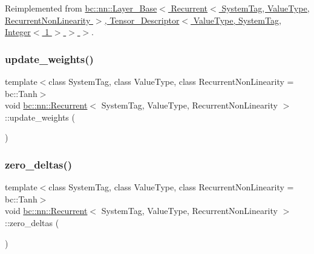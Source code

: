 Reimplemented from \hyperlink{structbc_1_1nn_1_1Layer__Base_a8365fc3fc656aadeb0513d8e02b5fba0}{bc\+::nn\+::\+Layer\+\_\+\+Base$<$ Recurrent$<$ System\+Tag, Value\+Type, Recurrent\+Non\+Linearity $>$, Tensor\+\_\+\+Descriptor$<$ Value\+Type, System\+Tag, Integer$<$ 1 $>$ $>$ $>$}.

\mbox{\label{structbc_1_1nn_1_1Recurrent_adcbd0a7b6f9306df5eed70afcb62ef56}} 
\subsubsection{\texorpdfstring{update\+\_\+weights()}{update\_weights()}}
{\footnotesize\ttfamily template$<$class System\+Tag, class Value\+Type, class Recurrent\+Non\+Linearity = bc\+::\+Tanh$>$ \\
void \hyperlink{structbc_1_1nn_1_1Recurrent}{bc\+::nn\+::\+Recurrent}$<$ System\+Tag, Value\+Type, Recurrent\+Non\+Linearity $>$\+::update\+\_\+weights (\begin{DoxyParamCaption}{ }\end{DoxyParamCaption})\hspace{0.3cm}{\ttfamily [inline]}}

\mbox{\label{structbc_1_1nn_1_1Recurrent_a9be53cb4ab91cbcccb5f6ab855456b04}} 
\subsubsection{\texorpdfstring{zero\+\_\+deltas()}{zero\_deltas()}}
{\footnotesize\ttfamily template$<$class System\+Tag, class Value\+Type, class Recurrent\+Non\+Linearity = bc\+::\+Tanh$>$ \\
void \hyperlink{structbc_1_1nn_1_1Recurrent}{bc\+::nn\+::\+Recurrent}$<$ System\+Tag, Value\+Type, Recurrent\+Non\+Linearity $>$\+::zero\+\_\+deltas (\begin{DoxyParamCaption}{ }\end{DoxyParamCaption})\hspace{0.3cm}{\ttfamily [inline]}}

